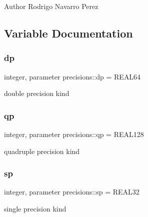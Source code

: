 \begin{DoxyAuthor}{Author}
Rodrigo Navarro Perez 
\end{DoxyAuthor}


\subsection{Variable Documentation}
\mbox{\label{namespaceprecisions_a70c0046430d95734ae5df77254ce2897}} 
\subsubsection{\texorpdfstring{dp}{dp}}
{\footnotesize\ttfamily integer, parameter precisions\+::dp = R\+E\+A\+L64}



double precision kind 

\mbox{\label{namespaceprecisions_a3ab2fa4401db1cceb93ec85a83aa4a90}} 
\subsubsection{\texorpdfstring{qp}{qp}}
{\footnotesize\ttfamily integer, parameter precisions\+::qp = R\+E\+A\+L128}



quadruple precision kind 

\mbox{\label{namespaceprecisions_a82ad0ad3a64dfde3aab0a00aff168e0d}} 
\subsubsection{\texorpdfstring{sp}{sp}}
{\footnotesize\ttfamily integer, parameter precisions\+::sp = R\+E\+A\+L32}



single precision kind 

